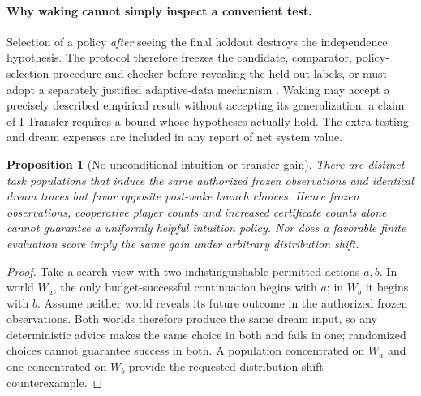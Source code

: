 \documentclass[11pt,letterpaper]{article}
\theoremstyle{definition}
\theoremstyle{plain}
\newtheorem{proposition}[definition]{Proposition}
\theoremstyle{definition}
\begin{document}
\paragraph{Why waking cannot simply inspect a convenient test.}
Selection of a policy \emph{after} seeing the final holdout destroys the
independence hypothesis. The protocol therefore freezes the candidate,
comparator, policy-selection procedure and checker before revealing the
held-out labels, or must adopt a separately justified adaptive-data
mechanism \cite{dwork}. Waking may accept a precisely described empirical
result without accepting its generalization; a claim of \textsf{I-Transfer}
requires a bound whose hypotheses actually hold. The extra testing
and dream expenses are included in any report of net system value.

\begin{proposition}[No unconditional intuition or transfer gain]
There are distinct task populations that induce the same authorized frozen
observations and identical dream traces but favor opposite post-wake
branch choices. Hence frozen observations, cooperative player counts and
increased certificate counts alone cannot guarantee a uniformly helpful
intuition policy. Nor does a favorable finite evaluation score imply the
same gain under arbitrary distribution shift.
\end{proposition}
\begin{proof}
Take a search view with two indistinguishable permitted actions $a,b$.
In world $W_a$, the only budget-successful continuation begins with $a$;
in $W_b$ it begins with $b$. Assume neither world reveals its future
outcome in the authorized frozen observations. Both worlds therefore
produce the same dream input, so any deterministic advice makes the same
choice in both and fails in one; randomized choices cannot guarantee
success in both. A population concentrated on $W_a$ and one concentrated
on $W_b$ provide the requested distribution-shift counterexample.
\end{proof}
\end{document}
